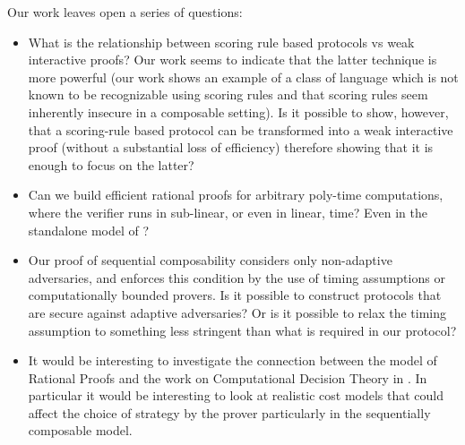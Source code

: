 Our work leaves open a series of questions:
\begin{itemize}
	\item What is the relationship between scoring rule based protocols vs weak interactive proofs? Our work seems to indicate that the latter technique is more powerful (our work shows an example of a class of language which is not known to be recognizable using scoring rules and that scoring rules seem inherently insecure in a composable setting). Is it possible to show, however, that a scoring-rule based protocol can be transformed into a weak interactive proof (without a substantial loss of efficiency) therefore showing that it is enough to focus on the latter?
	
	\item Can we build efficient rational proofs for arbitrary poly-time computations, where the verifier runs in sub-linear, or even in linear, time? Even in the standalone model of \cite{am}?
	
	\item Our proof of sequential composability considers only non-adaptive adversaries, and enforces this condition by the use of timing assumptions or computationally bounded provers. Is it possible to construct protocols that are secure against adaptive adversaries? Or is it possible to relax the timing assumption to something less stringent than what is required in our protocol?
	
	\item It would be interesting to investigate the connection between the model of Rational Proofs and the work on Computational Decision Theory in  \cite{halpern2011don}. In particular it would be interesting to look at realistic cost models that could affect the choice of strategy by the prover particularly in the sequentially composable model. 
\end{itemize}

